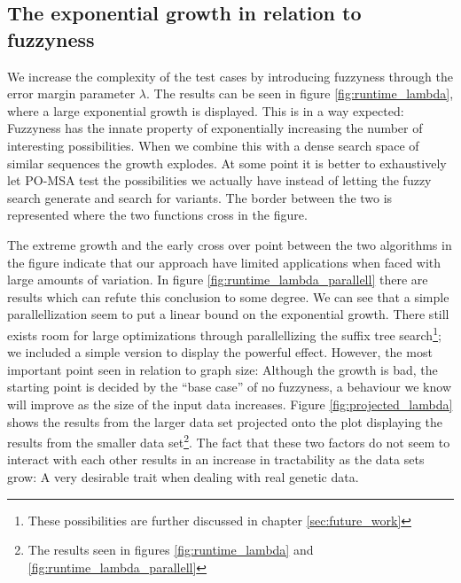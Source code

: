 \documentclass[thesis.tex]{subfiles}
\begin{document}
\subsection*{The exponential growth in relation to fuzzyness}
We increase the complexity of the test cases by introducing fuzzyness through the error margin parameter $\lambda$. The results can be seen in figure \ref{fig:runtime_lambda}, where a large exponential growth is displayed. This is in a way expected: Fuzzyness has the innate property of exponentially increasing the number of interesting possibilities. When we combine this with a dense search space of similar sequences the growth explodes. At some point it is better to exhaustively let PO-MSA test the possibilities we actually have instead of letting the fuzzy search generate and search for variants. The border between the two is represented where the two functions cross in the figure.\\
\par\noindent
The extreme growth and the early cross over point between the two algorithms in the figure indicate that our approach have limited applications when faced with large amounts of variation. In figure \ref{fig:runtime_lambda_parallell} there are results which can refute this conclusion to some degree. We can see that a simple parallellization seem to put a linear bound on the exponential growth. There still exists room for large optimizations through parallellizing the suffix tree search\footnote{These possibilities are further discussed in chapter \ref{sec:future_work}}; we included a simple version to display the powerful effect. However, the most important point seen in relation to graph size: Although the growth is bad, the starting point is decided by the ``base case'' of no fuzzyness, a behaviour we know will improve as the size of the input data increases. Figure \ref{fig:projected_lambda} shows the results from the larger data set projected onto the plot displaying the results from the smaller data set\footnote{The results seen in figures \ref{fig:runtime_lambda} and \ref{fig:runtime_lambda_parallell}}. The fact that these two factors do not seem to interact with each other results in an increase in tractability as the data sets grow: A very desirable trait when dealing with real genetic data. 
\end{document}

